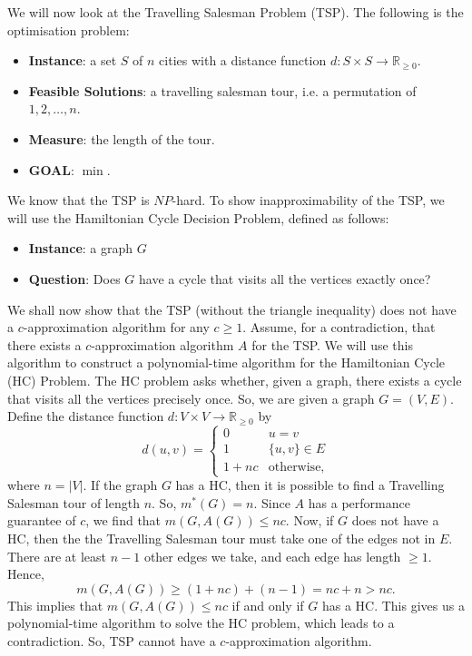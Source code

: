 \documentclass[a4paper, openany]{memoir}
\begin{document}
    We will now look at the Travelling Salesman Problem (TSP). The following is the optimisation problem:
    \begin{itemize}
        \item \textbf{Instance}: a set $S$ of $n$ cities with a distance function $d \colon S \times S \to \mathbb{R}_{\geq 0}$.
        \item \textbf{Feasible Solutions}: a travelling salesman tour, i.e. a permutation of $1, 2, \dots, n$.
        \item \textbf{Measure}: the length of the tour.
        \item \textbf{GOAL}: $\min$.
    \end{itemize}
    We know that the TSP is $NP$-hard. To show inapproximability of the TSP, we will use the Hamiltonian Cycle Decision Problem, defined as follows:
    \begin{itemize}
        \item \textbf{Instance}: a graph $G$
        \item \textbf{Question}: Does $G$ have a cycle that visits all the vertices exactly once?
    \end{itemize}

    We shall now show that the TSP (without the triangle inequality) does not have a $c$-approximation algorithm for any $c \geq 1$. Assume, for a contradiction, that there exists a $c$-approximation algorithm $A$ for the TSP. We will use this algorithm to construct a polynomial-time algorithm for the Hamiltonian Cycle (HC) Problem. The HC problem asks whether, given a graph, there exists a cycle that visits all the vertices precisely once. So, we are given a graph $G = (V, E)$. Define the distance function $d \colon V \times V \to \mathbb{R}_{\geq 0}$ by
    \[d(u, v) = \begin{cases}
        0 & u = v \\
        1 & \{u, v\} \in E \\
        1 + nc & \textrm{otherwise},
    \end{cases}\]
    where $n = |V|$. If the graph $G$ has a HC, then it is possible to find a Travelling Salesman tour of length $n$.
    So, $m^*(G) = n$. Since $A$ has a performance guarantee of $c$, we find that $m(G, A(G)) \leq nc$. Now, if $G$ does not have a HC, then the the Travelling Salesman tour must take one of the edges not in $E$. 
    There are at least $n-1$ other edges we take, and each edge has length $\geq 1$. Hence,
    \[m(G, A(G)) \geq (1 + nc) + (n - 1) = nc + n > nc.\]
    This implies that $m(G, A(G)) \leq nc$ if and only if $G$ has a HC. This gives us a polynomial-time algorithm to solve the HC problem, which leads to a contradiction. So, TSP cannot have a $c$-approximation algorithm.
\end{document}
